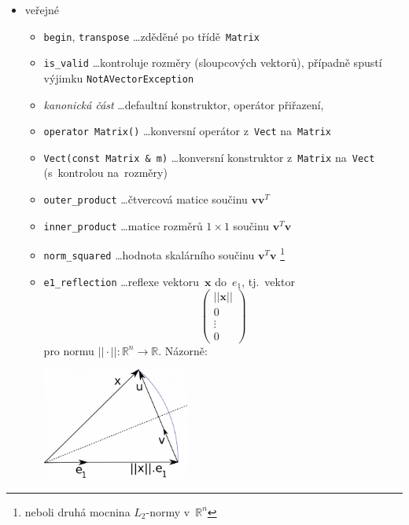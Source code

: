 \documentclass[11pt,a4paper]{article}
\newcommand{\R}{\mathbb{R}}
\newcommand{\V}{\mathbf{v}}
\newcommand{\x}{\mathbf{x}}
\begin{document}
\begin{itemize}
  \item veřejné
  \begin{itemize}
    \item \verb=begin=, \verb=transpose= \ldots zděděné po třídě~\verb=Matrix=
    \item \verb=is_valid= \ldots kontroluje rozměry (sloupcových vektorů),
      případně spustí výjimku \verb=NotAVectorException=
    \item \emph{kanonická část\/} \ldots defaultní konstruktor, operátor
      přiřazení, 
    \item \verb=operator Matrix()= \ldots konversní operátor z~\verb=Vect=
      na~\verb=Matrix=
    \item \verb=Vect(const Matrix & m)= \ldots konversní konstruktor
      z~\verb=Matrix= na~\verb=Vect= (s~kontrolou na~rozměry)
    \item \verb=outer_product= \ldots čtvercová matice součinu $\V\V^T$
    \item \verb=inner_product= \ldots matice rozměrů $1\times 1$ součinu
      $\V^T\V$
    \item \verb=norm_squared= \ldots hodnota skalárního součinu
      $\V^T\V$\thinspace%
      \footnote{neboli druhá mocnina $L_2$-normy v~$\R^n$}
    \item \verb=e1_reflection= \ldots reflexe vektoru~$\x$ do~$e_1$, tj.~vektor
      \[
        \begin{pmatrix}
          ||\x|| \\
          0 \\
          \vdots \\
          0
        \end{pmatrix}
      \]
      pro normu $||\cdot||\colon \R^n \to \R$.
      Názorně:

      \begin{center}
      \includegraphics[width=0.4\textwidth]{./householder_reflection.png}
      \end{center}


\end{itemize}
\end{itemize}
\end{document}
